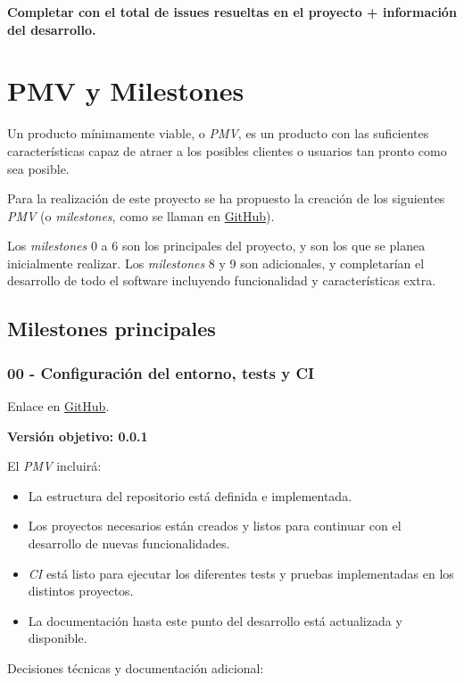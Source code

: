 \textbf{Completar con el total de issues resueltas en el proyecto + información del desarrollo.}

\section{PMV y Milestones}

Un producto mínimamente viable, o \textit{PMV}, es un producto con las suficientes características capaz de atraer a los posibles clientes o usuarios tan pronto como sea posible.

Para la realización de este proyecto se ha propuesto la creación de los siguientes \textit{PMV} (o \textit{milestones}, como se llaman en \href{https://github.com/harvestcore/matroos/milestones}{GitHub}).

Los \textit{milestones} 0 a 6 son los principales del proyecto, y son los que se planea inicialmente realizar. Los \textit{milestones} 8 y 9 son adicionales, y completarían el desarrollo de todo el software incluyendo funcionalidad y características extra.

\subsection{Milestones principales}

\subsubsection{00 - Configuración del entorno, tests y CI}

Enlace en \href{https://github.com/harvestcore/matroos/milestone/3}{GitHub}.

\textbf{Versión objetivo: 0.0.1}

El \textit{PMV} incluirá:

\begin{itemize}
	\item La estructura del repositorio está definida e implementada.
	\item Los proyectos necesarios están creados y listos para continuar con el desarrollo de nuevas funcionalidades.
	\item \textit{CI} está listo para ejecutar los diferentes tests y pruebas implementadas en los distintos proyectos.
	\item La documentación hasta este punto del desarrollo está actualizada y disponible.
\end{itemize}

Decisiones técnicas y documentación adicional:

